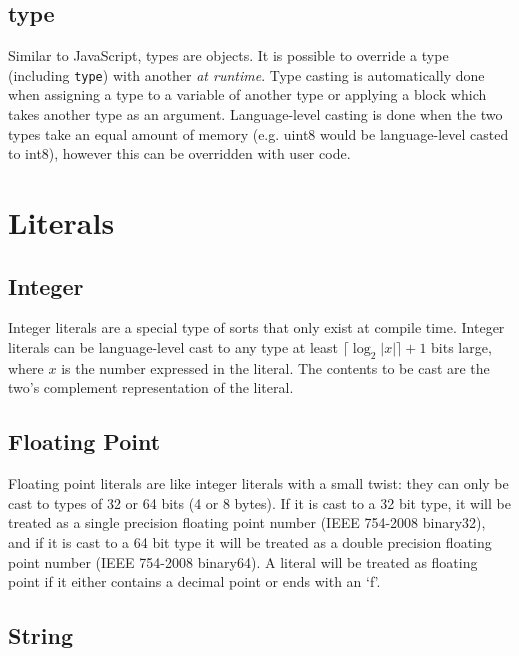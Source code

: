 \documentclass[letterpaper,titlepage]{scrreprt}
\begin{document}
\subsection{type}
\label{subsec:type}

Similar to JavaScript, types are objects. It is possible to override a type (including \lstinline{type}) with another \emph{at runtime}. Type casting is automatically done when assigning a type to a variable of another type or applying a block which takes another type as an argument. Language-level casting is done when the two types take an equal amount of memory (e.g. uint8 would be language-level casted to int8), however this can be overridden with user code.

\section{Literals}
\label{sec:Literals}

\subsection{Integer}
\label{subsec:Integer}

Integer literals are a special type of sorts that only exist at compile time. Integer literals can be language-level cast to any type at least $\lceil\log_2 |x|\rceil + 1$ bits large, where $x$ is the number expressed in the literal. The contents to be cast are the two's complement representation of the literal.

\subsection{Floating Point}
\label{subsec:FloatingPoint}

Floating point literals are like integer literals with a small twist: they can only be cast to types of 32 or 64 bits (4 or 8 bytes). If it is cast to a 32 bit type, it will be treated as a single precision floating point number (IEEE 754-2008 binary32), and if it is cast to a 64 bit type it will be treated as a double precision floating point number (IEEE 754-2008 binary64). A literal will be treated as floating point if it either contains a decimal point or ends with an `f'.

\subsection{String}
\label{subsec:String}
\end{document}
